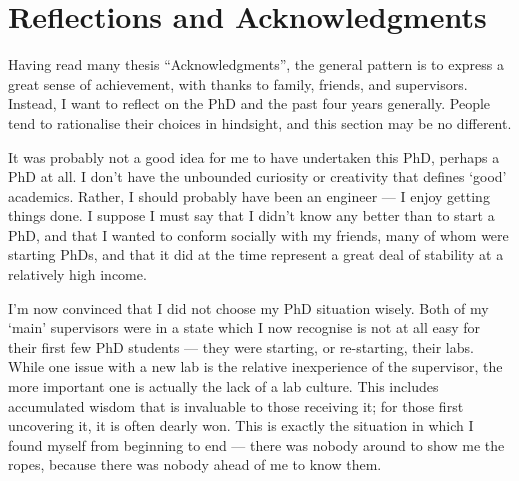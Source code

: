 {}%
%
\chapter*{Reflections and Acknowledgments}\label{ch:ack}


\bigskip

\begingroup
\let\clearpage\relax
\let\cleardoublepage\relax
\let\cleardoublepage\relax

Having read many thesis ``Acknowledgments'', the general pattern is to express a great sense of achievement, with thanks to family, friends, and supervisors.
Instead, I want to reflect on the PhD and the past four years generally.
People tend to rationalise their choices in hindsight, and this section may be no different.

It was probably not a good idea for me to have undertaken this PhD, perhaps a PhD at all.
I don't have the unbounded curiosity or creativity that defines `good' academics.
Rather, I should probably have been an engineer --- I enjoy getting things done.
I suppose I must say that I didn't know any better than to start a PhD, and that I wanted to conform socially with my friends, many of whom were starting PhDs, and that it did at the time represent a great deal of stability at a relatively high income.

I'm now convinced that I did not choose my PhD situation wisely.
Both of my `main' supervisors were in a state which I now recognise is not at all easy for their first few PhD students --- they were starting, or re-starting, their labs.
While one issue with a new lab is the relative inexperience of the supervisor, the more important one is actually the lack of a lab culture.
This includes accumulated wisdom that is invaluable to those receiving it; for those first uncovering it, it is often dearly won.
This is exactly the situation in which I found myself from beginning to end --- there was nobody around to show me the ropes, because there was nobody ahead of me to know them.

